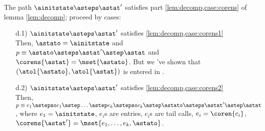 \documentclass{LMCS}
\theoremstyle{definition} \newtheorem{property}[thm]{Property}
\begin{document}
\begin{enumerate}[$\bullet$]
  The path $\ainitstate \asteps \astat'$ satisfies
  part \ref{lem:decomp,case:corens} of lemma \ref{lem:decomp};
  proceed by cases:
  \begin{enumerate}[$\bullet$]
  \item[d.1)]
    $\ainitstate \asteps \astat'$ satisfies \ref{lem:decomp,case:corens1}\\
    Then, $\astato = \ainitstate$ and 
    $p \equiv \astato \asteps \astat' \astep \astat$
    and $\corens{\astat} = \mset{\astato}$.
    But we 've shown that $(\atol{\astato}, \atol{\astat})$ is entered in \seen.
  \item[d.2)]
    $\ainitstate \asteps \astat'$ satisfies \ref{lem:decomp,case:corens2}\\
    Then,
    $p \equiv e_1 \astepso c_1 \astep \dots \astep e_k \astepso c_k 
    \astep \astato \asteps \astat' \astep \astat$, 
    where $e_1 = \ainitstate$, $e_i$s are entries, $c_i$s are tail calls,
    $e_i = \coren{c_i}$, 
    $\corens{\astat'} = \mset{e_1, \dots, e_k, \astato}$.


\end{enumerate}
\end{enumerate}
\end{document}
